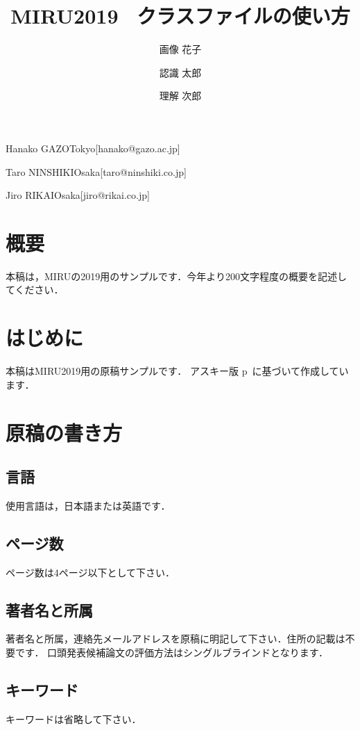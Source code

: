 \documentclass[MIRU,submit]{miru2019j}
\begin{document}
\title{MIRU2019 \LaTeXe\ クラスファイルの使い方}


 \author{画像 花子}{Hanako GAZO}{Tokyo}[hanako@gazo.ac.jp]
 \author{認識 太郎}{Taro NINSHIKI}{Osaka}[taro@ninshiki.co.jp]
 \author{理解 次郎}{Jiro RIKAI}{Osaka}[jiro@rikai.co.jp]


\maketitle

\section*{概要}
本稿は，MIRUの2019用のサンプルです．今年より200文字程度の概要を記述してください．

\section{はじめに}
本稿はMIRU2019用の原稿サンプルです．
アスキー版 p\LaTeXe\ に基づいて作成しています．

\section{原稿の書き方}

\subsection{言語}
使用言語は，日本語または英語です．

\subsection{ページ数}
ページ数は4ページ以下として下さい．

\subsection{著者名と所属}
著者名と所属，連絡先メールアドレスを原稿に明記して下さい．住所の記載は不要です．
口頭発表候補論文の評価方法はシングルブラインドとなります．

\subsection{キーワード}
キーワードは省略して下さい．
\end{document}
